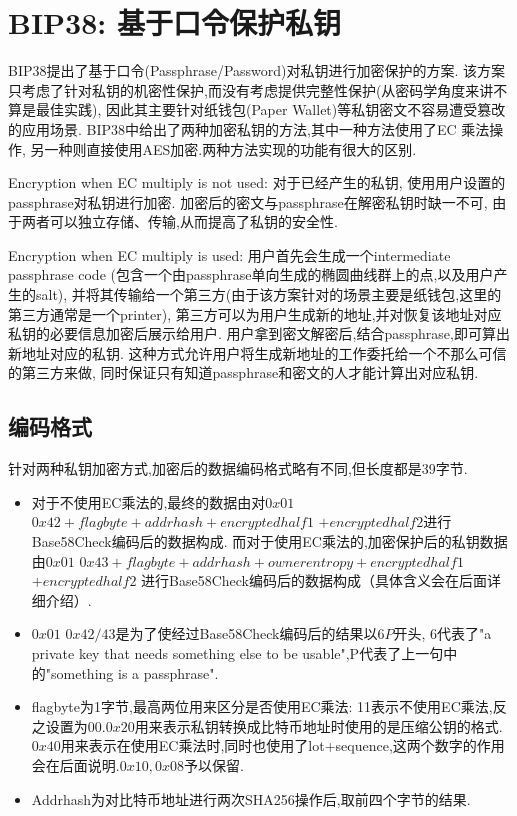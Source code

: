 \section{BIP38: 基于口令保护私钥}

BIP38提出了基于口令(Passphrase/Password)对私钥进行加密保护的方案.
该方案只考虑了针对私钥的机密性保护,而没有考虑提供完整性保护(从密码学角度来讲不算是最佳实践),
因此其主要针对纸钱包(Paper Wallet)等私钥密文不容易遭受篡改的应用场景.
BIP38中给出了两种加密私钥的方法,其中一种方法使用了EC 乘法操作,
另一种则直接使用AES加密.两种方法实现的功能有很大的区别.

Encryption when EC multiply is not used: 对于已经产生的私钥,
使用用户设置的passphrase对私钥进行加密.
加密后的密文与passphrase在解密私钥时缺一不可,
由于两者可以独立存储、传输,从而提高了私钥的安全性.

Encryption when EC multiply is used: 用户首先会生成一个intermediate passphrase code 
(包含一个由passphrase单向生成的椭圆曲线群上的点,以及用户产生的salt),
并将其传输给一个第三方(由于该方案针对的场景主要是纸钱包,这里的第三方通常是一个printer),
第三方可以为用户生成新的地址,并对恢复该地址对应私钥的必要信息加密后展示给用户.
用户拿到密文解密后,结合passphrase,即可算出新地址对应的私钥.
这种方式允许用户将生成新地址的工作委托给一个不那么可信的第三方来做,
同时保证只有知道passphrase和密文的人才能计算出对应私钥.

\subsection{ 编码格式}

针对两种私钥加密方式,加密后的数据编码格式略有不同,但长度都是39字节.

\begin{itemize}
\item 对于不使用EC乘法的,最终的数据由对$0x01$ $0x42+ flagbyte+ addrhash+ encryptedhalf1$ 
 $+ encryptedhalf2$进行Base58Check编码后的数据构成.
而对于使用EC乘法的,加密保护后的私钥数据由$0x01$
 $0x43+ flagbyte+ addrhash+ ownerentropy+ encryptedhalf1$ $+ encryptedhalf2$
 进行Base58Check编码后的数据构成（具体含义会在后面详细介绍）.

\item $0x01$ $0x42/43$是为了使经过Base58Check编码后的结果以$6P$开头,
6代表了"a private key that needs something else to be usable",P代表了上一句中的"something is a passphrase".

\item flagbyte为1字节,最高两位用来区分是否使用EC乘法:
11表示不使用EC乘法,反之设置为00.$0x20$用来表示私钥转换成比特币地址时使用的是压缩公钥的格式.
$0x40$用来表示在使用EC乘法时,同时也使用了lot+sequence,这两个数字的作用会在后面说明.$0x10,0x08$予以保留.

\item Addrhash为对比特币地址进行两次SHA256操作后,取前四个字节的结果.
\end{itemize}

